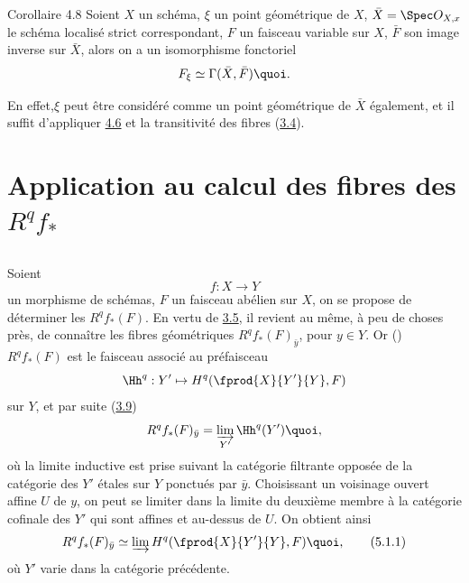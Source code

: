 \documentclass[10pt]{../fichiers-configuration-latex/smfart}
\begin{document}
\begin{enonce*}{Corollaire 4.8}
Soient $X$ un schéma, $\xi$ un point géométrique de $X$, $\bar{X} =
\Spec O_{X, x}$ le schéma localisé strict correspondant, $F$ un
faisceau variable sur $X$, $\bar{F}$ son image inverse sur
$\bar{X}$, alors on a un isomorphisme fonctoriel
$$
F_{\xi} \simeq \Gamma (\bar{X}, \bar{F}){\quoi}.
$$
\end{enonce*}

\noindent
En effet,\pageoriginale $\xi$ peut être considéré comme un point géométrique de
$\bar{X}$ également, et il suffit d'appliquer \hyperref[VIII.prop4.6]{4.6}
et la transitivité
des fibres (\hyperref[VIII.subsec3.4]{3.4}).

\section{Application au calcul des fibres des $R^{q}
  f_{*}$}

\subsection{}

Soient
$$
f : X \to Y
$$
un morphisme de schémas, $F$ un faisceau abélien sur $X$, on se
propose de déterminer les $R^q f_{\ast} (F)$. En vertu de
\hyperref[VIII.thm3.5]{3.5}, il revient au même, à peu de choses près, de
connaître les fibres géométriques $R^q f_{\ast} (F)_{\bar{y}}$, pour
$y \in Y$. Or () $R^q f_{\ast}(F)$ est le faisceau
associé au préfaisceau
$$
\Hh^q : Y' \mapsto H^q (\fprod{X}{Y'}{Y}, F)
$$
sur $Y$, et par suite (\hyperref[VIII.prop3.9]{3.9})
$$
R^q f_{\ast} (F)_{\bar{y}} = \varinjlim_{Y'} \Hh^q (Y'){\quoi},
$$
où la limite inductive est prise suivant la catégorie filtrante
opposée de la catégorie des $Y'$ étales sur $Y$ ponctués par
$\bar{y}$. Choisissant un voisinage ouvert affine $U$ de $y$, on peut
se limiter dans la limite du deuxième membre à la catégorie cofinale
des $Y'$ qui sont affines et au-dessus de $U$. On obtient ainsi
\begin{equation*}
R^q f_{\ast} (F)_{\bar{y}} \simeq \varinjlim H^q (\fprod{X}{Y'}{Y},
F){\quoi},\tag{5.1.1}
\end{equation*}
où $Y'$ varie dans la catégorie précédente.
\end{document}
